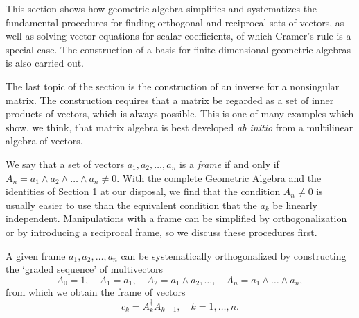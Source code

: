 \documentclass[fleqn]{scrartcl}
\numberwithin{equation}{section}
\begin{document}
\vspace{1em}
\noindent This section shows how geometric algebra simplifies and systematizes the fundamental procedures for finding orthogonal and reciprocal sets of vectors, as well as solving vector equations for scalar coefficients, of which Cramer's rule is a special case. The construction of a basis for finite dimensional geometric algebras is also carried out.

\vspace{1em}
\noindent The last topic of the section is the construction of an inverse for a nonsingular matrix. The construction requires that a matrix be regarded as a set of inner products of vectors, which is always possible. This is one of many examples which show, we think, that matrix algebra is best developed \textit{ab initio} from a multilinear algebra of vectors.

\vspace{1em}
\noindent We say that a set of vectors \(a_1, a_2, \dots, a_n\) is a \textit{frame} if and only if \(A_n = a_1 \wedge a_2 \wedge \dots \wedge a_n \neq 0\). With the complete Geometric Algebra and the identities of Section 1 at our disposal, we find that the condition \(A_n \neq 0\) is usually easier to use than the equivalent condition that the \(a_k\) be linearly independent. Manipulations with a frame can be simplified by orthogonalization or by introducing a reciprocal frame, so we discuss these procedures first.

\vspace{1em}
\noindent A given frame \(a_1, a_2, \dots, a_n\) can be systematically orthogonalized by constructing the `graded sequence' of multivectors
\begin{equation}
A_0 = 1, \quad A_1 = a_1, \quad A_2 = a_1 \wedge a_2, \dots, \quad A_n = a_1 \wedge \dots \wedge a_n, \tag{3.1}
\end{equation}
from which we obtain the frame of vectors
\begin{equation}
c_k = A_k^{\dagger} A_{k-1}, \quad k = 1, \dots, n. \tag{3.2}
\end{equation}
\end{document}
